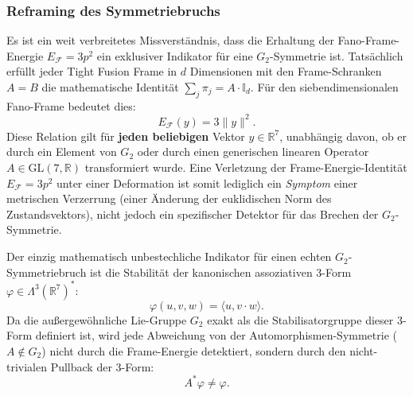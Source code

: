 \documentclass[11pt,a4paper]{article}
\theoremstyle{definition}
\begin{document}
	\subsubsection{Reframing des Symmetriebruchs}
	Es ist ein weit verbreitetes Missverständnis, dass die Erhaltung der Fano-Frame-Energie $E_{\mathcal{F}} = 3p^2$ ein exklusiver Indikator für eine $G_2$-Symmetrie ist. Tatsächlich erfüllt jeder Tight Fusion Frame in $d$ Dimensionen mit den Frame-Schranken $A = B$ die mathematische Identität $\sum_{j} \pi_j = A \cdot \mathbb{I}_d$. Für den siebendimensionalen Fano-Frame bedeutet dies:
	\begin{equation}
		E_{\mathcal{F}}(y) = 3 \|y\|^2.
	\end{equation}
	Diese Relation gilt für \textbf{jeden beliebigen} Vektor $y \in \mathbb{R}^7$, unabhängig davon, ob er durch ein Element von $G_2$ oder durch einen generischen linearen Operator $A \in \mathrm{GL}(7, \mathbb{R})$ transformiert wurde. Eine Verletzung der Frame-Energie-Identität $E_{\mathcal{F}} = 3p^2$ unter einer Deformation ist somit lediglich ein \emph{Symptom} einer metrischen Verzerrung (einer Änderung der euklidischen Norm des Zustandsvektors), nicht jedoch ein spezifischer Detektor für das Brechen der $G_2$-Symmetrie.
	
	Der einzig mathematisch unbestechliche Indikator für einen echten $G_2$-Symmetriebruch ist die Stabilität der kanonischen assoziativen 3-Form $\varphi \in \Lambda^3(\mathbb{R}^7)^*$:
	\begin{equation}
		\varphi(u, v, w) = \langle u, v \cdot w \rangle.
	\end{equation}
	Da die außergewöhnliche Lie-Gruppe $G_2$ exakt als die Stabilisatorgruppe dieser 3-Form definiert ist, wird jede Abweichung von der Automorphismen-Symmetrie ($A \notin G_2$) nicht durch die Frame-Energie detektiert, sondern durch den nicht-trivialen Pullback der 3-Form:
	\begin{equation}
		A^* \varphi \neq \varphi.
	\end{equation}
	
\end{document}
